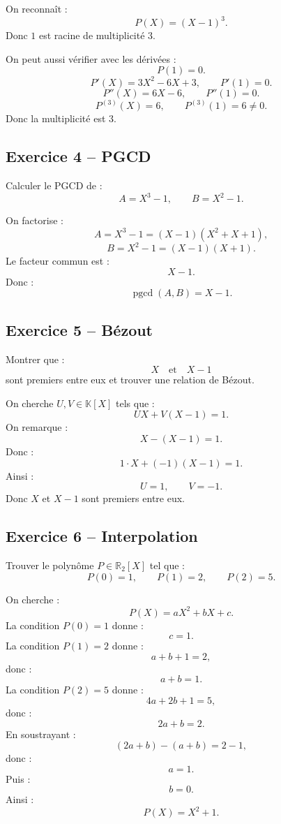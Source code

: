 \documentclass[11pt,a4paper]{article}
\newcommand{\K}{\mathbb K}
\newcommand{\R}{\mathbb R}
\newcommand{\pgcd}{\operatorname{pgcd}}
\begin{document}
\begin{correctionbox}
On reconnaît :
\[
P(X)=(X-1)^3.
\]
Donc \(1\) est racine de multiplicité \(3\).

On peut aussi vérifier avec les dérivées :
\[
P(1)=0.
\]
\[
P'(X)=3X^2-6X+3,
\qquad
P'(1)=0.
\]
\[
P''(X)=6X-6,
\qquad
P''(1)=0.
\]
\[
P^{(3)}(X)=6,
\qquad
P^{(3)}(1)=6\neq0.
\]
Donc la multiplicité est \(3\).
\end{correctionbox}

\subsection*{Exercice 4 -- PGCD}

\begin{exercicebox}
Calculer le PGCD de :
\[
A=X^3-1,
\qquad
B=X^2-1.
\]
\end{exercicebox}

\begin{correctionbox}
On factorise :
\[
A=X^3-1=(X-1)(X^2+X+1),
\]
\[
B=X^2-1=(X-1)(X+1).
\]
Le facteur commun est :
\[
X-1.
\]
Donc :
\[
\pgcd(A,B)=X-1.
\]
\end{correctionbox}

\subsection*{Exercice 5 -- Bézout}

\begin{exercicebox}
Montrer que :
\[
X
\quad\text{et}\quad
X-1
\]
sont premiers entre eux et trouver une relation de Bézout.
\end{exercicebox}

\begin{correctionbox}
On cherche \(U,V\in\K[X]\) tels que :
\[
UX+V(X-1)=1.
\]
On remarque :
\[
X-(X-1)=1.
\]
Donc :
\[
1\cdot X+(-1)(X-1)=1.
\]
Ainsi :
\[
U=1,
\qquad
V=-1.
\]
Donc \(X\) et \(X-1\) sont premiers entre eux.
\end{correctionbox}

\subsection*{Exercice 6 -- Interpolation}

\begin{exercicebox}
Trouver le polynôme \(P\in\R_2[X]\) tel que :
\[
P(0)=1,\qquad P(1)=2,\qquad P(2)=5.
\]
\end{exercicebox}

\begin{correctionbox}
On cherche :
\[
P(X)=aX^2+bX+c.
\]
La condition \(P(0)=1\) donne :
\[
c=1.
\]
La condition \(P(1)=2\) donne :
\[
a+b+1=2,
\]
donc :
\[
a+b=1.
\]
La condition \(P(2)=5\) donne :
\[
4a+2b+1=5,
\]
donc :
\[
2a+b=2.
\]
En soustrayant :
\[
(2a+b)-(a+b)=2-1,
\]
donc :
\[
a=1.
\]
Puis :
\[
b=0.
\]
Ainsi :
\[
P(X)=X^2+1.
\]
\end{correctionbox}
\end{document}
